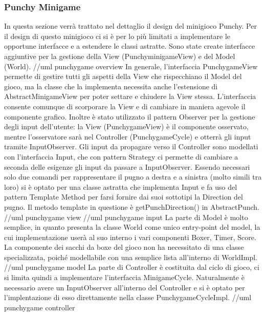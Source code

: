 \documentclass[a4paper,12pt]{report}
\begin{document}
	\subsubsection{Punchy Minigame}
	In questa sezione verrà trattato nel dettaglio il design del minigioco Punchy.\newline
	\newline
	Per il design di questo minigioco ci si è per lo più limitati a implementare le opportune interfacce e a estendere le classi astratte. Sono state create interfacce aggiuntive per la gestione della View (PunchyminigameView) e del Model (World).
	\newline
	//uml punchygame overview\newline
	\newline
	In generale, l'interfaccia PunchygameView permette di gestire tutti gli aspetti della View che rispecchiano il Model del gioco, ma la classe che la implementa necessita anche l'estensione di AbstractMinigameView per poter settare e chiudere la View stessa. L'interfaccia consente comunque di scorporare la View e di cambiare in maniera agevole il componente grafico.\newline
	Inoltre è stato utilizzato il pattern Observer per la gestione degli input dell'utente: la View (PunchygameView) è il componente osservato, mentre l'osservatore sarà nel Controller (PunchygameCycle) e otterrà gli input tramite InputObserver.\newline
	Gli input da propagare verso il Controller sono modellati con l'interfaccia Input, che con pattern Strategy ci permette di cambiare a seconda delle esigenze gli input da passare a InputObserver. Essendo necessari solo due comandi per rappresentare il pugno a destra e a sinistra (molto simili tra loro) si è optato per una classe astratta che implementa Input e fa uso del pattern Template Method per farsi fornire dai suoi sottotipi la Direction del pugno.
	Il metodo template in questione è getPunchDirection() in AbstractPunch.
	\newline
	//uml punchygame view\newline
	//uml punchygame input\newline
	\newline
	La parte di Model è molto semplice, in quanto presenta la classe World come unico entry-point del model, la cui implementazione userà al suo interno i vari componenti Boxer, Timer, Score. La componente dei sacchi da boxe del gioco non ha necessitato di una classe specializzata, poiché modellabile con una semplice lista all'interno di WorldImpl.\newline
	\newline
	//uml punchygame model\newline
	\newline
	La parte di Controller è costituita dal ciclo di gioco, ci si limita quindi a implementare l'interfaccia
	MinigameCycle. Naturalmente è necessario avere un InputObserver all'interno del Controller e si è optato per l'implentazione di esso direttamente nella classe PunchygameCycleImpl.
	\newline
	//uml punchygame controller\newline
	\newline
\end{document}
